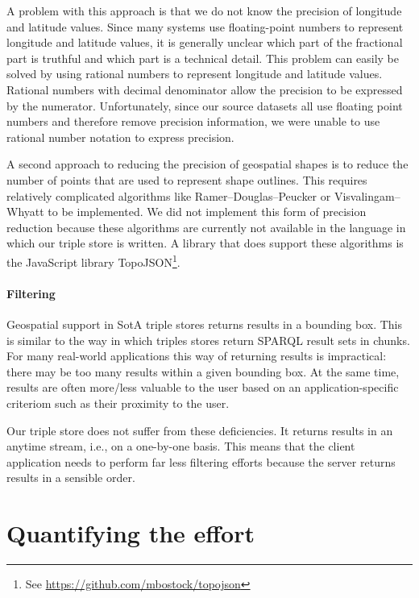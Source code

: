 \documentclass[a4paper]{scrartcl}
\newcommand{\seeUrl}[1]{\footnote{See \mbox{\url{#1}}}}
\begin{document}
A problem with this approach is that we do not know the precision of
longitude and latitude values.  Since many systems use floating-point
numbers to represent longitude and latitude values, it is generally
unclear which part of the fractional part is truthful and which part
is a technical detail.  This problem can easily be solved by using
rational numbers to represent longitude and latitude values.  Rational
numbers with decimal denominator allow the precision to be expressed
by the numerator.  Unfortunately, since our source datasets all use
floating point numbers and therefore remove precision information, we
were unable to use rational number notation to express precision.

A second approach to reducing the precision of geospatial shapes is to
reduce the number of points that are used to represent shape outlines.
This requires relatively complicated algorithms like
Ramer–Douglas–Peucker or Visvalingam–Whyatt to be implemented.  We did
not implement this form of precision reduction because these
algorithms are currently not available in the language in which our
triple store is written.  A library that does support these algorithms
is the JavaScript library
TopoJSON\seeUrl{https://github.com/mbostock/topojson}.


\paragraph{Filtering}
Geospatial support in SotA triple stores returns results in a bounding
box.  This is similar to the way in which triples stores return SPARQL
result sets in chunks.  For many real-world applications this way of
returning results is impractical: there may be too many results within
a given bounding box.  At the same time, results are often more/less
valuable to the user based on an application-specific criteriom such
as their proximity to the user.

Our triple store does not suffer from these deficiencies.  It returns
results in an anytime stream, i.e., on a one-by-one basis.  This means
that the client application needs to perform far less filtering
efforts because the server returns results in a sensible order.



\section{Quantifying the effort}
\label{sec:quantifying}
\end{document}
